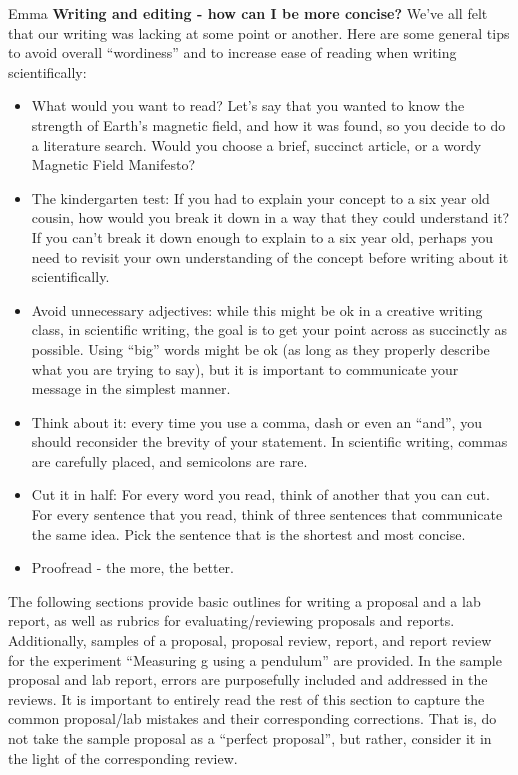 \newpage
\begin{studentOpinion}{Emma}
\textbf{Writing and editing - how can I be more concise?}
We've all felt that our writing was lacking at some point or another. Here are some general tips to avoid overall ``wordiness'' and to increase ease of reading when writing scientifically: 
\begin{itemize}
\item What would you want to read? Let's say that you wanted to know the strength of Earth's magnetic field, and how it was found, so you decide to do a literature search. Would you choose a brief, succinct article, or a wordy Magnetic Field Manifesto?
\item The kindergarten test: If you had to explain your concept to a six year old cousin, how would you break it down in a way that they could understand it? If you can't break it down enough to explain to a six year old, perhaps you need to revisit your own understanding of the concept before writing about it scientifically.
\item Avoid unnecessary adjectives: while this might be ok in a creative writing class, in scientific writing, the goal is to get your point across as succinctly as possible. Using ``big'' words might be ok (as long as they properly describe what you are trying to say), but it is important to communicate your message in the simplest manner. 
\item Think about it: every time you use a comma, dash or even an ``and'', you should reconsider the brevity of your statement. In scientific writing, commas are carefully placed, and semicolons are rare. 
\item Cut it in half: For every word you read, think of another that you can cut. For every sentence that you read, think of three sentences that communicate the same idea. Pick the sentence that is the shortest and most concise. 
\item Proofread - the more, the better.
\end{itemize}
\end{studentOpinion}

The following sections provide basic outlines for writing a proposal and a lab report, as well as rubrics for evaluating/reviewing proposals and reports. Additionally, samples of a proposal, proposal review, report, and report review for the experiment ``Measuring g using a pendulum'' are provided. In the sample proposal and lab report, errors are purposefully included and addressed in the reviews. It is important to entirely read the rest of this section to capture the common proposal/lab mistakes and their corresponding corrections. That is, do not take the sample proposal as a ``perfect proposal'', but rather, consider it in the light of the corresponding review.
\newpage


